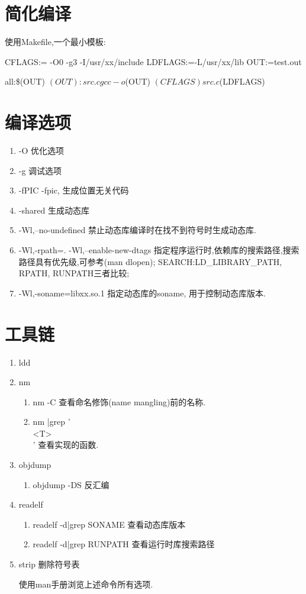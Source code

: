 \section{简化编译}
使用Makefile,一个最小模板:

CFLAGS:= -O0 -g3 -I/usr/xx/include
LDFLAGS:=-L/usr/xx/lib
OUT:=test.out

all:\$(OUT)
$(OUT): src.c
    gcc -o $(OUT) $(CFLAGS) src.c $(LDFLAGS)

\section{编译选项}

\begin{enumerate}
\item -O 优化选项
\item -g 调试选项
\item -fPIC -fpic, 生成位置无关代码
\item -shared 生成动态库
\item -Wl,--no-undefined  禁止动态库编译时在找不到符号时生成动态库.
\item -Wl,-rpath=. -Wl,--enable-new-dtags
        指定程序运行时,依赖库的搜索路径,搜索路径具有优先级,可参考(man dlopen);
        SEARCH:LD\_LIBRARY\_PATH, RPATH, RUNPATH三者比较;
\item -Wl,-soname=libxx.so.1
        指定动态库的soname, 用于控制动态库版本.
\end{enumerate}

\section{工具链}

\begin{enumerate}
\item ldd
\item nm
        \begin{enumerate}
        \item  nm -C
                查看命名修饰(name mangling)前的名称.
        \item  nm |grep '\\<T>\\'
                查看实现的函数.
        \end{enumerate}
\item objdump
        \begin{enumerate}
        \item  objdump -DS
                反汇编
        \end{enumerate}
\item readelf
        \begin{enumerate}
        \item  readelf -d|grep SONAME
                查看动态库版本
        \item  readelf -d|grep RUNPATH
                 查看运行时库搜索路径
        \end{enumerate}
\item strip
        删除符号表

使用man手册浏览上述命令所有选项.
\end{enumerate}

